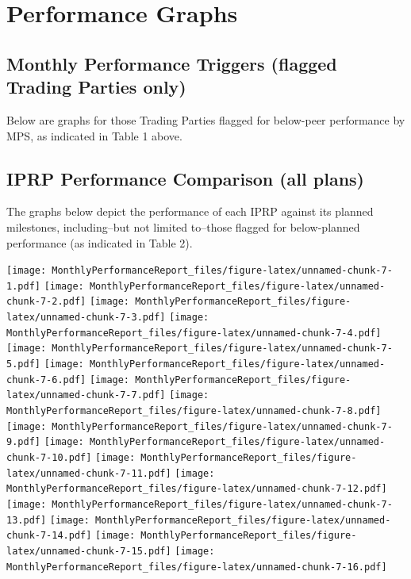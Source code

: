 \documentclass[12pt,table]{article}
\begin{document}
\pagebreak

\hypertarget{performance-graphs}{%
\section{Performance Graphs}\label{performance-graphs}}

\hypertarget{monthly-performance-triggers-flagged-trading-parties-only}{%
\subsection{Monthly Performance Triggers (flagged Trading Parties
only)}\label{monthly-performance-triggers-flagged-trading-parties-only}}

Below are graphs for those Trading Parties flagged for below-peer
performance by MPS, as indicated in Table 1 above.

\pagebreak

\hypertarget{iprp-performance-comparison-all-plans}{%
\subsection{IPRP Performance Comparison (all
plans)}\label{iprp-performance-comparison-all-plans}}

The graphs below depict the performance of each IPRP against its planned
milestones, including--but not limited to--those flagged for
below-planned performance (as indicated in Table 2).

\texttt{[image: MonthlyPerformanceReport\_files/figure-latex/unnamed-chunk-7-1.pdf]}
\texttt{[image: MonthlyPerformanceReport\_files/figure-latex/unnamed-chunk-7-2.pdf]}
\texttt{[image: MonthlyPerformanceReport\_files/figure-latex/unnamed-chunk-7-3.pdf]}
\texttt{[image: MonthlyPerformanceReport\_files/figure-latex/unnamed-chunk-7-4.pdf]}
\texttt{[image: MonthlyPerformanceReport\_files/figure-latex/unnamed-chunk-7-5.pdf]}
\texttt{[image: MonthlyPerformanceReport\_files/figure-latex/unnamed-chunk-7-6.pdf]}
\texttt{[image: MonthlyPerformanceReport\_files/figure-latex/unnamed-chunk-7-7.pdf]}
\texttt{[image: MonthlyPerformanceReport\_files/figure-latex/unnamed-chunk-7-8.pdf]}
\texttt{[image: MonthlyPerformanceReport\_files/figure-latex/unnamed-chunk-7-9.pdf]}
\texttt{[image: MonthlyPerformanceReport\_files/figure-latex/unnamed-chunk-7-10.pdf]}
\texttt{[image: MonthlyPerformanceReport\_files/figure-latex/unnamed-chunk-7-11.pdf]}
\texttt{[image: MonthlyPerformanceReport\_files/figure-latex/unnamed-chunk-7-12.pdf]}
\texttt{[image: MonthlyPerformanceReport\_files/figure-latex/unnamed-chunk-7-13.pdf]}
\texttt{[image: MonthlyPerformanceReport\_files/figure-latex/unnamed-chunk-7-14.pdf]}
\texttt{[image: MonthlyPerformanceReport\_files/figure-latex/unnamed-chunk-7-15.pdf]}
\texttt{[image: MonthlyPerformanceReport\_files/figure-latex/unnamed-chunk-7-16.pdf]}
\end{document}
